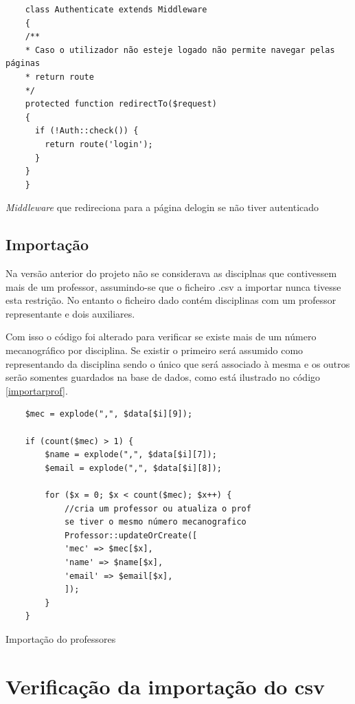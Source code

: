 \documentclass[12pt, twoside]{report}
\begin{document}
	\begin{listing}[H]
	\begin{verbatim}
	class Authenticate extends Middleware
	{
	/**
	* Caso o utilizador não esteje logado não permite navegar pelas páginas
	* return route
	*/
	protected function redirectTo($request)
	{
	  if (!Auth::check()) {
		return route('login');
	  }
	}
	}
				\end{verbatim}
				\caption{\textit{Middleware} que redireciona para a página delogin se não tiver autenticado}
				\label{autenticarMiddl}
			\end{listing}    
		
	\subsection{Importação}
	
	Na versão anterior do projeto não se considerava as disciplnas que contivessem mais de um professor, assumindo-se que o ficheiro .csv a importar nunca tivesse esta restrição. No entanto o ficheiro dado contém disciplinas com um professor representante e dois auxiliares. 
	
	Com isso o código foi alterado para verificar se existe mais de um número mecanográfico por disciplina. Se existir o primeiro será assumido como representando da disciplina sendo o único que será associado à mesma e os outros serão somentes guardados na base de dados, como está ilustrado no código \ref{importarprof}. 
	

	\begin{listing}[H]
	\begin{verbatim}
	$mec = explode(",", $data[$i][9]);
			
	if (count($mec) > 1) {
		$name = explode(",", $data[$i][7]);
		$email = explode(",", $data[$i][8]);
				
		for ($x = 0; $x < count($mec); $x++) {
			//cria um professor ou atualiza o prof 
			se tiver o mesmo número mecanografico
			Professor::updateOrCreate([
			'mec' => $mec[$x],
			'name' => $name[$x],
			'email' => $email[$x],
			]);
		}
	}
	\end{verbatim}
	\caption{Importação do professores}
	\label{importarprof}
	\end{listing}
	
	\section{Verificação da importação do csv}
	
\end{document}
